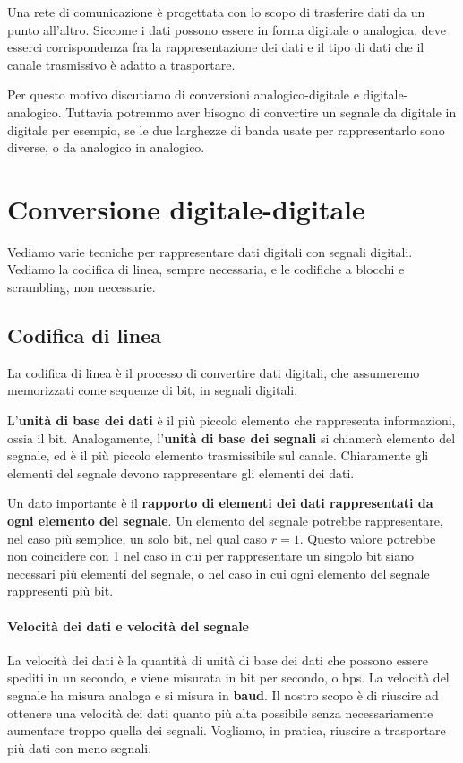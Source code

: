 Una rete di comunicazione è progettata con lo scopo di trasferire dati da un punto all'altro. Siccome i dati possono essere in forma digitale o analogica, deve esserci corrispondenza fra la rappresentazione dei dati e il tipo di dati che il canale trasmissivo è adatto a trasportare.

Per questo motivo discutiamo di conversioni analogico-digitale e digitale-analogico. Tuttavia potremmo aver bisogno di convertire un segnale da digitale in digitale per esempio, se le due larghezze di banda usate per rappresentarlo sono diverse, o da analogico in analogico.

\section{Conversione digitale-digitale}
    Vediamo varie tecniche per rappresentare dati digitali con segnali digitali. Vediamo la codifica di linea, sempre necessaria, e le codifiche a blocchi e scrambling, non necessarie.
    
    \subsection{Codifica di linea}
        La codifica di linea è il processo di convertire dati digitali, che assumeremo memorizzati come sequenze di bit, in segnali digitali.
        
        L'\textbf{unità di base dei dati} è il più piccolo elemento che rappresenta informazioni, ossia il bit. Analogamente, l'\textbf{unità di base dei segnali} si chiamerà elemento del segnale, ed è il più piccolo elemento trasmissibile sul canale. Chiaramente gli elementi del segnale devono rappresentare gli elementi dei dati.
        
        Un dato importante è il \textbf{rapporto di elementi dei dati rappresentati da ogni elemento del segnale}. Un elemento del segnale potrebbe rappresentare, nel caso più semplice, un solo bit, nel qual caso $r = 1$. Questo valore potrebbe non coincidere con 1 nel caso in cui per rappresentare un singolo bit siano necessari più elementi del segnale, o nel caso in cui ogni elemento del segnale rappresenti più bit.
        
        \paragraph{Velocità dei dati e velocità del segnale} La velocità dei dati è la quantità di unità di base dei dati che possono essere spediti in un secondo, e viene misurata in bit per secondo, o bps. La velocità del segnale ha misura analoga e si misura in \textbf{baud}. Il nostro scopo è di riuscire ad ottenere una velocità dei dati quanto più alta possibile senza necessariamente aumentare troppo quella dei segnali. Vogliamo, in pratica, riuscire a trasportare più dati con meno segnali.
        
